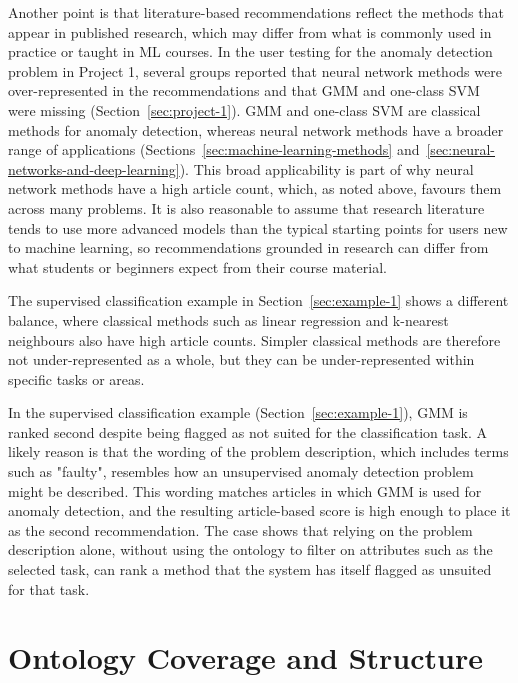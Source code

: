 Another point is that literature-based recommendations reflect 
the methods that appear in published research, which may differ from 
what is commonly used in practice or taught in ML courses. In the 
user testing for the anomaly detection problem in Project 1, several 
groups reported that neural network methods were over-represented in 
the recommendations and that GMM and one-class 
SVM were missing (Section~\ref{sec:project-1}). GMM
and one-class SVM are classical methods for 
anomaly detection, whereas neural network methods have a broader 
range of applications 
(Sections~\ref{sec:machine-learning-methods} 
and~\ref{sec:neural-networks-and-deep-learning}). This broad 
applicability is part of why neural network methods have a high 
article count, which, as noted above, favours them across many 
problems. It is also reasonable to assume that research literature tends to 
use more advanced models than the typical starting points for users 
new to machine learning, so recommendations grounded in research can 
differ from what students or beginners expect from their course 
material.

The supervised classification example in 
Section~\ref{sec:example-1} shows a different balance, where 
classical methods such as linear regression and k-nearest neighbours 
also have high article counts. Simpler classical methods are therefore not 
under-represented as a whole, but they can be under-represented 
within specific tasks or areas.

In the supervised classification example 
(Section~\ref{sec:example-1}), GMM is ranked 
second despite being flagged as not suited for the classification 
task. A likely reason is that the wording of the problem 
description, which includes terms such as "faulty", resembles how an 
unsupervised anomaly detection problem might be described. This 
wording matches articles in which GMM is used for 
anomaly detection, and the resulting article-based score is high 
enough to place it as the second recommendation. The case shows that 
relying on the problem description alone, without using the ontology 
to filter on attributes such as the selected task, can rank a method 
that the system has itself flagged as unsuited for that task.

\section{Ontology Coverage and Structure}
\label{sec:ontology-coverage-and-structure}

